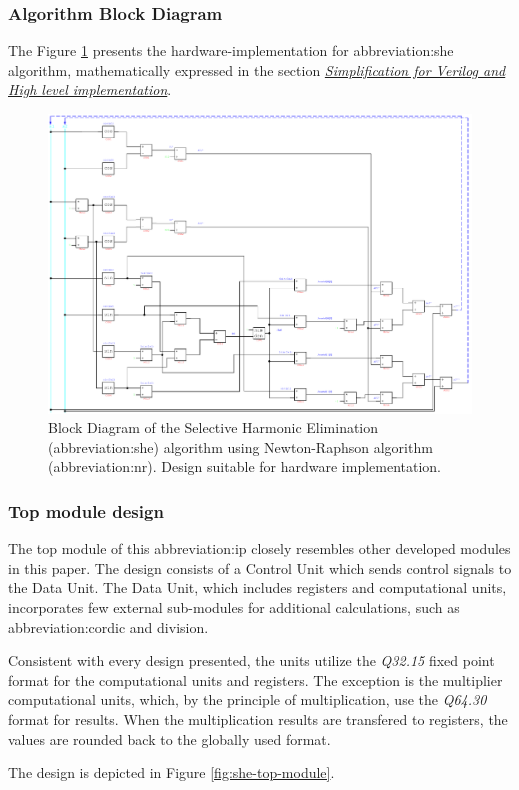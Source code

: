 \documentclass[a4paper, twoside, 11pt]{article}
\begin{document}
        \subsubsection{Algorithm Block Diagram}\label{subsubsec:algorithm-block-design}
            The Figure \ref{fig:she-overview} presents the hardware-implementation for \gls{abbreviation:she} algorithm, mathematically expressed in the section \hyperref[subsec:simplification-for-verilog-and-high-level-implementation]{\textit{Simplification for Verilog and High level implementation}}.
            \begin{figure}[htbp!]
                \centering
                \includegraphics[width=1\textwidth]{src/pdf/she-overview.pdf}
                \caption{Block Diagram of the Selective Harmonic Elimination (\gls{abbreviation:she}) algorithm using Newton-Raphson algorithm (\gls{abbreviation:nr}). Design suitable for hardware implementation.}
                \label{fig:she-overview}
            \end{figure}

    \FloatBarrier
        \subsubsection{Top module design}
            The top module of this \gls{abbreviation:ip} closely resembles other developed modules in this paper. The design consists of a Control Unit which sends control signals to the Data Unit. The Data Unit, which includes registers and computational units, incorporates few external sub-modules for additional calculations, such as \gls{abbreviation:cordic} and division.\par
            Consistent with every design presented, the units utilize the \textit{Q32.15} fixed point format for the computational units and registers. The exception is the multiplier computational units, which, by the principle of multiplication, use the \textit{Q64.30} format for results. When the multiplication results are transfered to registers, the values are rounded back to the globally used format.\par
            The design is depicted in Figure \ref{fig:she-top-module}.
\end{document}
